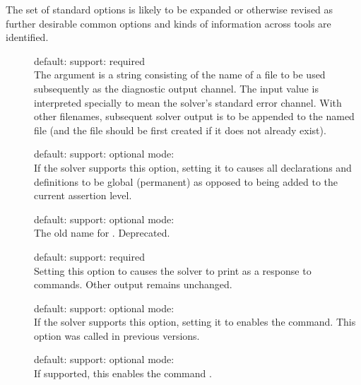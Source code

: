 The set of standard options is likely to be expanded or otherwise revised 
as further desirable common options and kinds of information across tools
are identified.  

\begin{description}

\item[] 
\quad default: 
\quad support: required
\\
The argument is a string consisting of the name of a file to be used subsequently 
as the diagnostic output channel.
The input value  is interpreted specially to mean 
the solver's standard error channel.  
With other filenames, subsequent solver output is to be appended to the named file 
(and the file should be first created if it does not  already exist).

\item[] 
\quad default: 
\quad support: optional
\quad mode: 
\\
If the solver supports this option, setting it to  causes all
declarations and definitions to be global (permanent) as opposed to being added
to the current assertion level.

\item[] 
\quad default: 
\quad support: optional
\quad mode: 
\\
The old name for . 
Deprecated.

\item[] 
\quad default: 
\quad support: required
\\
Setting this option to  causes the solver to print 
 as a response to commands.  
Other output remains unchanged.

\item[] 
\quad default: 
\quad support: optional
\quad mode: 
\\
If the solver supports this option, setting it to  enables 
the  command.
This option was called  in previous versions.

\item[] 
\quad default: 
\quad support: optional
\quad mode: 
\\
If supported, this enables the command .  


\end{description}
